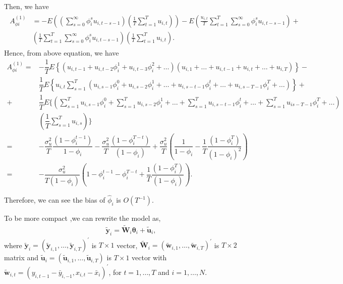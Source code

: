\documentclass[12pt,a4paper,hyperref]{article}
\begin{document}
Then, we have
\begin{align}
\begin{split}
A^{(1)}_{\phi i}&=-E\left( \left(\sum^{\infty}_{s=0}\phi^{s}_{i}u_{i,t-s-1} \right) \left(\frac{1}{T}\sum^{T}_{t=1}u_{i,t} \right)  \right)-E\left(\frac{u_{i,t}}{T}\sum^{T}_{t=1}\sum^{\infty}_{s=0}\phi^{s}_{i}u_{i,t-s-1} \right)+ \\
&\left(\frac{1}{T}\sum^{T}_{t=1}\sum^{\infty}_{s=0}\phi^{s}_{i}u_{i,t-s-1} \right)\left( \frac{1}{T}\sum^{T}_{t=1}u_{i,t} \right). \label{12}
\end{split}
\end{align}
 Hence, from above equation, we have
 \begin{equation}
\begin{split}
A^{(1)}_{\phi i}=&-\dfrac{1}{T} E\left\{  \left( u_{i,t-1}+u_{i,t-2}\phi_{i}^{1}+u_{i,t-3}\phi_{i}^{2}+\ldots\right)\left(u_{i,1}+\ldots+u_{i,t-1}+u_{i,t}+\ldots+u_{i,T}\right) \right\} -\\
 &\dfrac{1}{T} E \left\{  u_{i,t}\sum^{T}_{s=1}\left( u_{i,s-1}\phi_{i}^{0}+u_{i,s-2}\phi_{i}^{1}+\ldots+u_{i,s-t-1}\phi_{i}^{t}+\ldots+u_{i,s-T-1}\phi_{i}^{T}+\ldots \right)  \right\}  + \\
 +& \dfrac{1}{T} E\{ \left( \sum^{T}_{s=1}u_{i,s-1}\phi_{i}^{0}+\sum^{T}_{s=1}u_{i,s-2}\phi_{i}^{1}+\ldots+\sum^{T}_{s=1}u_{i,s-t-1}\phi_{i}^{t}+\ldots
+\sum^{T}_{s=1}u_{is-T-1}\phi_{i}^{T}+\ldots \right)\\
 &\left(\dfrac{1}{T}\sum^{T}_{s=1}u_{i,s}\right) \} \\
 =&-\dfrac{\sigma_{u}^{2}}{T}\dfrac{(1-\phi_{i}^{t-1})}{1-\phi_{i}}-\dfrac{\sigma^{2}_{u}}{T}\dfrac{(1-\phi_{i}^{T-t})}{(1-\phi_{i})}+\dfrac{\sigma^{2}_{u}}{T} \left( \dfrac{1}{1-\phi_{i}}-\dfrac{1}{T}\dfrac{(1-\phi_{i}^{T})}{(1-\phi_{i})^{2}}\right) \\
 =&-\dfrac{\sigma_{u}^{2}}{T(1-\phi_{i})}\left( 1-\phi_{i}^{t-1}-\phi_{i}^{T-t}+\dfrac{1}{T}\dfrac{(1-\phi_{i}^{T})}{(1-\phi_{i})}  \right).
 \end{split}
\end{equation}


Therefore, we can see the bias of $\hat{\phi}_{i}$ is $O\left(T^{-1}\right)$.

To be more compact ,we can rewrite the model as,
\begin{align}
\tilde{\boldsymbol{y}}_{i}=\tilde{\boldsymbol{W}}_{i}\boldsymbol{\theta}_{i}+\tilde{\boldsymbol{u}}_{i},
\end{align}
where $\tilde{\boldsymbol{y}}_{i}=\left(\tilde{\boldsymbol{y}}_{i,1},\ldots, \tilde{\boldsymbol{y}}_{i,T}  \right)^{'}$ is $T \times 1$ vector,  $\tilde{\boldsymbol{W}}_{i}=\left( \tilde{\boldsymbol{w}}_{i,1},\ldots, \tilde{\boldsymbol{w}}_{i,T} \right)^{'}$ is $T \times 2$ matrix and $\tilde{\boldsymbol{u}}_{i}=\left(\tilde{\boldsymbol{u}}_{i,1}, \ldots, \tilde{\boldsymbol{u}}_{i,T} \right)$ is $T \times 1$ vector with $\tilde{\boldsymbol{w}}_{i,t}=\left(y_{i,t-1}-\bar{y}_{i,-1}, x_{i,t}-\bar{x}_{i}  \right)^{'}$, for $t=1,\ldots, T$ and $i=1,\ldots, N.$
\end{document}
